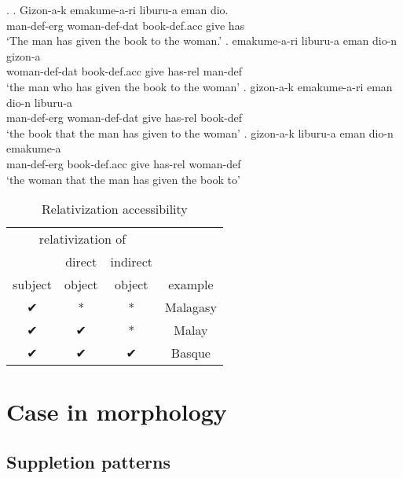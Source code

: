 \ex.
\ag. Gizon-a-k emakume-a-ri liburu-a eman dio.\\
 man-\ac{def}-\ac{erg} woman-\ac{def}-\ac{dat} book-\ac{def}.\ac{acc} give has\\
 `The man has given the book to the woman.'
\bg. emakume-a-ri liburu-a eman dio-n gizon-a\\
 woman-\ac{def}-\ac{dat} book-\ac{def}.\ac{acc} give has-\ac{rel} man-\ac{def}\\
 `the man who has given the book to the woman'
\bg. gizon-a-k emakume-a-ri eman dio-n liburu-a\\
 man-\ac{def}-\ac{erg} woman-\ac{def}-\ac{dat} give has-\ac{rel} book-\ac{def}\\
 `the book that the man has given to the woman'
\bg. gizon-a-k liburu-a eman dio-n emakume-a\\
 man-\ac{def}-\ac{erg} book-\ac{def}.\ac{acc} give has-\ac{rel} woman-\ac{def}\\
 `the woman that the man has given the book to' 




 \begin{table}[H]
   \center
   \caption {Relativization accessibility}
     \begin{tabular}{cccc}
       \toprule
             \multicolumn{3}{c}{relativization of}
           & \\
       \cmidrule{1-3}
             & direct
             & indirect
           & \\
             subject
             & object
             & object
           & example \\
       \cmidrule{1-3} \cmidrule{4-4}
             ✔
             & *
             & *
           & Malagasy \\
             ✔
             & ✔
             & *
           & Malay \\
             ✔
             & ✔
             & ✔
           & Basque \\
       \bottomrule
     \end{tabular}
 \end{table}






\section{Case in morphology}


\subsection{Suppletion patterns}

